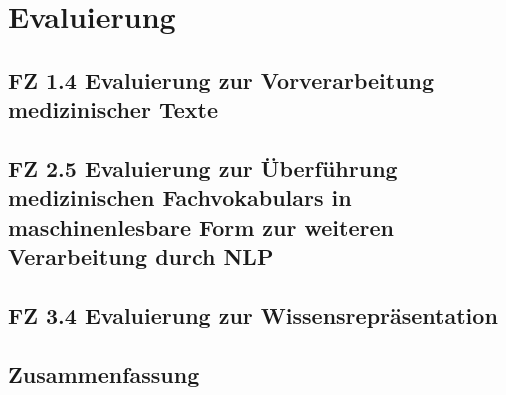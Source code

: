 \chapter{Evaluierung}
\label{ch:evaluierung}


\section{FZ 1.4 Evaluierung zur Vorverarbeitung medizinischer Texte}
\label{sec:FZ1.4} 

\section{FZ 2.5 Evaluierung zur Überführung medizinischen Fachvokabulars in maschinenlesbare Form zur weiteren Verarbeitung durch NLP}
\label{sec:FZ2.5} 

\section{FZ 3.4 Evaluierung zur Wissensrepräsentation}
\label{sec:FZ3.4} 

\section{Zusammenfassung}
\label{sec:zusammenfassung_evaluierung} 

